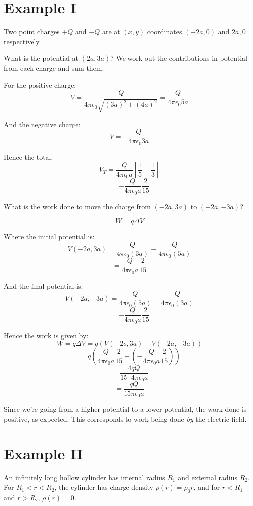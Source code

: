 
\section{Example I}
Two point charges $+Q$ and $-Q$ are at $(x, y)$ coordinates $(-2a, 0)$ and $2a, 0$ respectively. 

What is the potential at $(2a, 3a)$? We work out the contributions in potential from each charge and sum them.

For the positive charge:
\[
    V = \frac{Q}{4 \pi \epsilon_0 \sqrt{(3a)^2 + (4a)^2}} = \frac{Q}{4 \pi \epsilon_0 5a}
\]

And the negative charge:
\[
    V = -\frac{Q}{4 \pi \epsilon_0 3a}
\]

Hence the total:
\[
    V_T = \frac{Q}{4 \pi \epsilon_0 a} \left[\frac{1}{5} - \frac{1}{3}\right]
\]
\[
    = - \frac{Q}{4 \pi \epsilon_0 a} \frac{2}{15}
\]

What is the work done to move the charge from $(-2a, 3a)$ to $(-2a, -3a)$?

\[
    W = q \Delta V
\]

Where the initial potential is:
\[
    V(-2a, 3a) = \frac{Q}{4 \pi \epsilon_0 (3a)} - \frac{Q}{4 \pi \epsilon_0 (5a)}
\]
\[
    = \frac{Q}{4 \pi \epsilon_0 a} \frac{2}{15}
\]

And the final potential is:
\[
    V(-2a, -3a) = \frac{Q}{4 \pi \epsilon_0 (5a)} - \frac{Q}{4 \pi \epsilon_0 (3a)}
\]
\[
    = - \frac{Q}{4 \pi \epsilon_0 a} \frac{2}{15}
\]

Hence the work is given by:
\[
    W = q \Delta V = q \left( V(-2a, 3a) - V(-2a, -3a) \right)
\]
\[
    = q \left( \frac{Q}{4 \pi \epsilon_0 a} \frac{2}{15} - \left(- \frac{Q}{4 \pi \epsilon_0 a} \frac{2}{15} \right) \right)
\]
\[
    = \frac{4qQ}{15 \cdot 4 \pi \epsilon_0 a}
\]
\[
    = \frac{qQ}{15 \pi \epsilon_0 a}
\]

Since we're going from a higher potential to a lower potential, the work done is positive, as expected. This corresponds to work being done \emph{by} the electric field.

\section{Example II}
An infinitely long hollow cylinder has internal radius $R_1$ and external radius $R_2$. For $R_1 < r < R_2$, the cylinder has charge density $\rho(r) =\rho_0 r$, and for $r < R_1$ and $r > R_2$, $\rho(r) = 0$.

